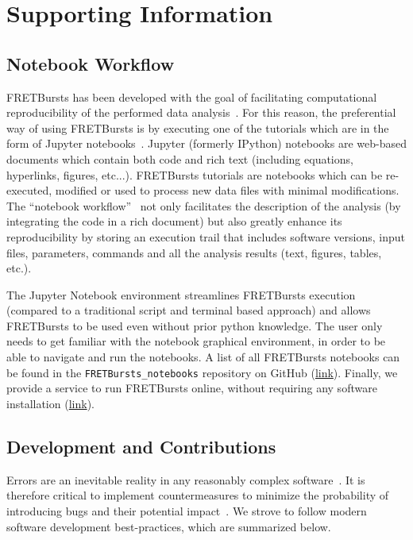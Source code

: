\section{Supporting Information}

\subsection{Notebook Workflow}
\label{sec:notebook}

FRETBursts has been developed with the goal of facilitating computational reproducibility
of the performed data analysis~\cite{Buckheit_1995}. For this reason,
the preferential way of using FRETBursts is by executing one of the tutorials
which are in the form of Jupyter notebooks~\cite{Shen_2014}.
Jupyter (formerly IPython) notebooks are web-based documents which contain both
code and rich text (including equations, hyperlinks, figures, etc...).
FRETBursts tutorials are notebooks which can be re-executed,
modified or used to process new data files with minimal modifications.
The ``notebook workflow''~\cite{Shen_2014} not only facilitates
the description of the analysis (by integrating the code in a rich document)
but also greatly enhance its reproducibility by storing an execution trail
that includes software versions, input files, parameters, commands and all
the analysis results (text, figures, tables, etc.).

The Jupyter Notebook environment streamlines FRETBursts execution (compared to
a traditional script and terminal based approach) and allows
FRETBursts to be used even without prior python knowledge.
The user only needs to get familiar with the
notebook graphical environment, in order to be able to navigate and run the notebooks.
A list of all FRETBursts notebooks can be found in the
\verb|FRETBursts_notebooks| repository on GitHub
(\href{https://github.com/tritemio/FRETBursts_notebooks}{link}).
Finally, we provide a service to run FRETBursts online,
without requiring any software installation 
(\href{https://github.com/tritemio/FRETBursts_notebooks#run-online}{link}).


\subsection{Development and Contributions}
\label{sec:dev}
Errors are an inevitable reality in any reasonably complex software~\cite{Merali_2010,Soergel_2015}. It is
therefore critical to implement countermeasures to
minimize the probability of introducing bugs and their potential impact~\cite{Prli__2012, Wilson_2014}.
We strove to follow modern software development best-practices, which are summarized
below.


